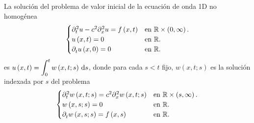 \begin{theorem}
	La solución del problema de valor inicial de la ecuación de onda 1D no homogénea
	\begin{equation*}
		\begin{cases}
			\difcp[2]{u}{t}-
			c^{2}\difcp[2]{u}{x}=
			f\left(x,t\right) &
			\text{en }\mathbb{R}\times\left(0,\infty\right). \\
			u\left(x,t\right)=
			0                 &
			\text{en }\mathbb{R}.                            \\
			\difcp{u}{t}\left(x,0\right)=
			0                 &
			\text{en }\mathbb{R}.
		\end{cases}
	\end{equation*}
	es
	\begin{math}\displaystyle
		u\left(x,t\right)=
		\int_{0}^{t}
		w\left(x,t;s\right)
		\dl s
	\end{math},
	donde para cada $s<t$ fijo, $w\left(x,t;s\right)$ es la solución
	indexada por $s$ del problema
	\begin{equation*}
		\begin{cases}
			\difcp[2]{w}{t}\left(x,t;s\right)=
			c^{2}\difcp[2]{w}{x}\left(x,t;s\right) &
			\text{en }\mathbb{R}\times\left(s,\infty\right). \\
			w\left(x,s;s\right)=
			0                                      &
			\text{en }\mathbb{R}.                            \\
			\difcp{w}{t}\left(x,s;s\right)=
			f\left(x,s\right)                      &
			\text{en }\mathbb{R}.
		\end{cases}
	\end{equation*}
\end{theorem}
